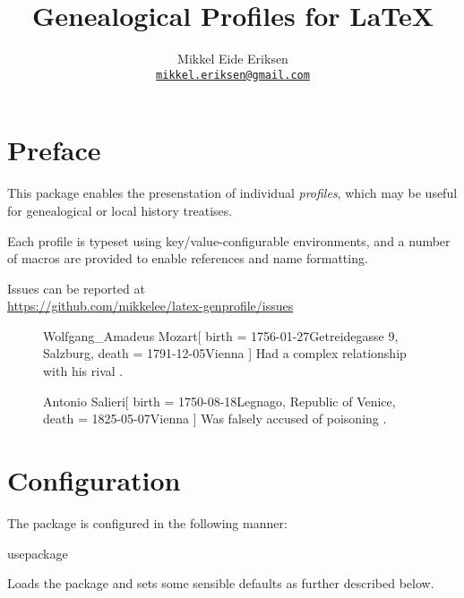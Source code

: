 \documentclass[
	a4paper,
]{article}
\title{Genealogical Profiles for \LaTeX}
\author{Mikkel Eide Eriksen\\%
	\href{mailto:mikkel.eriksen@gmail.com}{\texttt{mikkel.eriksen@gmail.com}}}
\begin{document}
\maketitle

\section{Preface} %

This package enables the presenstation of individual \emph{profiles}, which may be useful for genealogical or local history treatises.

Each profile is typeset using key/value-configurable environments, and a number of macros are provided to enable references and name formatting.

Issues can be reported at\\\null\hfill\url{https://github.com/mikkelee/latex-genprofile/issues}

\begin{figure}
\begingroup
{}
\begin{gprProfile}{Wolfgang_Amadeus Mozart}[
	birth = {1756-01-27}{Getreidegasse 9, Salzburg},
	death = {1791-12-05}{Vienna}
]
	Had a complex relationship with his rival .
\end{gprProfile}
\begin{gprProfile}{Antonio Salieri}[
	birth = {1750-08-18}{Legnago, Republic of Venice},
	death = {1825-05-07}{Vienna}
]
	Was falsely accused of poisoning .
\end{gprProfile}
\endgroup
\end{figure}

\clearpage
\section{Configuration} %

The package is configured in the following manner:

\begin{docCommand}
	{usepackage}
	{}

	Loads the package and sets some sensible defaults as further described below.

\end{docCommand}
\end{document}
